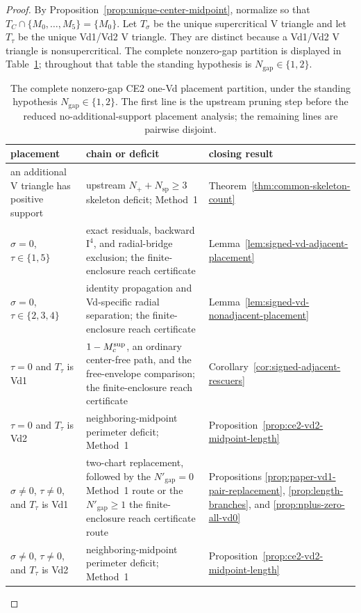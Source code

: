 \begin{proof}
By Proposition~\ref{prop:unique-center-midpoint}, normalize so that
$T_C\cap\{M_0,\ldots,M_5\}=\{M_0\}$.  Let $T_\sigma$ be the unique
supercritical V triangle and let $T_\tau$ be the unique Vd1/Vd2 V triangle.
They are distinct because a Vd1/Vd2 V triangle is nonsupercritical.  The
complete nonzero-gap partition is displayed in
Table~\ref{tab:ce2-one-vd-placement-cases}; throughout that table the standing
hypothesis is $N_{\mathrm{gap}}\in\{1,2\}$.

\begin{table}[H]
\centering
\scriptsize
\renewcommand{\arraystretch}{1.08}
\begin{tabular}{p{}p{}p{}}
\toprule
placement&chain or deficit&closing result\\
\midrule
an additional V triangle has positive support
 &upstream $N_++N_{\mathrm{sp}}\ge3$ skeleton deficit; Method~1
 &Theorem~\ref{thm:common-skeleton-count}\\
$\sigma=0$, $\tau\in\{1,5\}$
 &exact residuals, backward $\mathrm I^4$, and radial-bridge exclusion;
 the finite-enclosure reach certificate
 &Lemma~\ref{lem:signed-vd-adjacent-placement}\\
$\sigma=0$, $\tau\in\{2,3,4\}$
 &identity propagation and Vd-specific radial separation; the finite-enclosure reach certificate
 &Lemma~\ref{lem:signed-vd-nonadjacent-placement}\\
$\tau=0$ and $T_\tau$ is Vd1
 &$1-M_c^{\rm sup}$, an ordinary center-free path, and the free-envelope
 comparison; the finite-enclosure reach certificate
 &Corollary~\ref{cor:signed-adjacent-rescuers}\\
$\tau=0$ and $T_\tau$ is Vd2
 &neighboring-midpoint perimeter deficit; Method~1
 &Proposition~\ref{prop:ce2-vd2-midpoint-length}\\
$\sigma\ne0$, $\tau\ne0$, and $T_\tau$ is Vd1
 &two-chart replacement, followed by the $N'_{\mathrm{gap}}=0$ Method~1
 route or the $N'_{\mathrm{gap}}\ge1$ the finite-enclosure reach certificate route
 &Propositions \ref{prop:paper-vd1-pair-replacement},
 \ref{prop:length-branches}, and \ref{prop:nplus-zero-all-vd0}\\
$\sigma\ne0$, $\tau\ne0$, and $T_\tau$ is Vd2
 &neighboring-midpoint perimeter deficit; Method~1
 &Proposition~\ref{prop:ce2-vd2-midpoint-length}\\
\bottomrule
\end{tabular}
\caption{The complete nonzero-gap CE2 one-Vd placement partition, under the
standing hypothesis $N_{\mathrm{gap}}\in\{1,2\}$.  The first line is the
upstream pruning step before the reduced no-additional-support placement
analysis; the remaining lines are pairwise disjoint.}
\label{tab:ce2-one-vd-placement-cases}
\end{table}


\end{proof}
